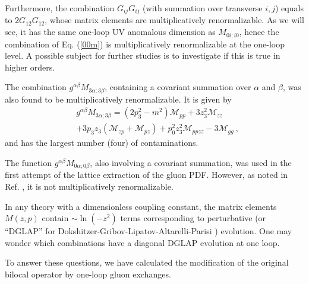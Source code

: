 Furthermore, the combination $G_{ij}G_{ij}$ (with summation over transverse $i,j$)
equals to $2G_{12} G_{12}$,
whose matrix elements are multiplicatively renormalizable.
As we will see, it has the same one-loop UV anomalous dimension
as ${M}_{0 i; i 0}$, hence the combination of Eq. (\ref{00m})
is multiplicatively renormalizable at the one-loop level.
A possible subject for further studies is to investigate
if this is true in higher orders.

The combination $g^{\alpha \beta} { M}_{3 \alpha; 3 \beta}$,
containing a covariant summation over $\alpha$ and $\beta$,
was also found to be multiplicatively renormalizable.
It is given by
\begin{align}
& g^{\alpha \beta} { M}_{3 \alpha; 3 \beta } =
\left(2p_3^2 - m^2 \right) \mathcal{M}_{pp} + 3z_3^2 \mathcal{M}_{zz}
\nonumber \\ & + 3 p_3 z_3 \left( \mathcal{M}_{zp}+ \mathcal{M}_{pz} \right) + p_0^2 z_3^2 \mathcal{M}_{ppzz}
-3\mathcal{M}_{gg} \ ,
\end{align}
and has the largest number (four) of contaminations.

The function $g^{\alpha \beta} { M}_{0 \alpha; 0 \beta}$, also
involving a covariant summation, was used in the first attempt
\cite{Fan:2018dxu}
of the lattice extraction of the gluon PDF. However, as noted in Ref.
\cite{Zhang:2018diq}, it is not multiplicatively renormalizable.

In any theory with a dimensionless coupling constant,
the matrix elements ${ M}(z,p)$
contain \mbox{$\sim \ln (-z^2)$} terms
corresponding to perturbative (or ``DGLAP'' for Dokshitzer-Gribov-Lipatov-Altarelli-Parisi
\cite{Gribov:1972ri,Altarelli:1977zs,Dokshitzer:1977sg})
evolution. One may wonder which combinations have
a diagonal DGLAP evolution at one loop.

To answer these questions, we have
calculated the modification of the original bilocal operator by
one-loop
gluon exchanges.

